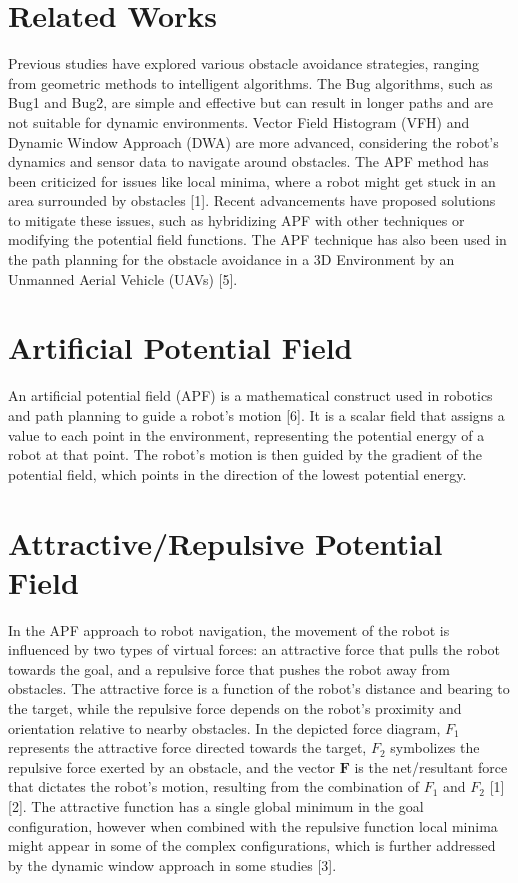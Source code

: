 \documentclass{article}
\begin{document}
\section*{Related Works}
Previous studies have explored various obstacle avoidance strategies, ranging from geometric methods to intelligent algorithms. The Bug algorithms, such as Bug1 and Bug2, are simple and effective but can result in longer paths and are not suitable for dynamic environments. Vector Field Histogram (VFH) and Dynamic Window Approach (DWA) are more advanced, considering the robot's dynamics and sensor data to navigate around obstacles. The APF method has been criticized for issues like local minima, where a robot might get stuck in an area surrounded by obstacles [1]. Recent advancements have proposed solutions to mitigate these issues, such as hybridizing APF with other techniques or modifying the potential field functions. The APF technique has also been used in the path planning for the obstacle avoidance in a 3D Environment by an Unmanned Aerial Vehicle (UAVs) [5].

\section*{Artificial Potential Field}
An artificial potential field (APF) is a mathematical construct used in robotics and path planning to guide a robot's motion [6]. It is a scalar field that assigns a value to each point in the environment, representing the potential energy of a robot at that point. The robot's motion is then guided by the gradient of the potential field, which points in the direction of the lowest potential energy.

\section*{Attractive/Repulsive Potential Field}
In the APF approach to robot navigation, the movement of the robot is influenced by two types of virtual forces: an attractive force that pulls the robot towards the goal, and a repulsive force that pushes the robot away from obstacles. The attractive force is a function of the robot's distance and bearing to the target, while the repulsive force depends on the robot's proximity and orientation relative to nearby obstacles. In the depicted force diagram, \( F_1 \) represents the attractive force directed towards the target, \( F_2 \) symbolizes the repulsive force exerted by an obstacle, and the vector \( \mathbf{F} \) is the net/resultant force that dictates the robot's motion, resulting from the combination of \( F_1 \) and \( F_2 \) [1][2]. The attractive function has a single global minimum in the goal configuration, however when combined with the repulsive function local minima might appear in some of the complex configurations, which is further addressed by the dynamic window approach in some studies [3].
\end{document}
